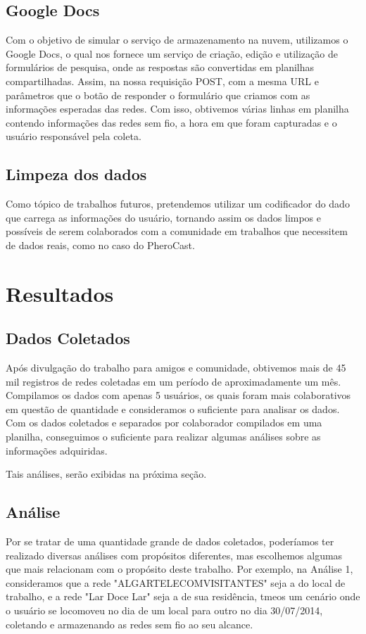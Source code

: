 \documentclass[12pt, %
openright, 
oneside,
a4paper,
brazil]{facom-ufu-abntex2}
\begin{document}
 \section{Google Docs}
Com o objetivo de simular o serviço de armazenamento na nuvem, utilizamos o Google Docs, o qual nos fornece um serviço de criação, edição e utilização de formulários de pesquisa, onde as respostas são convertidas em planilhas compartilhadas. Assim, na nossa requisição POST, com a mesma URL e parâmetros que o botão de responder o formulário que criamos com as informações esperadas das redes. Com isso, obtivemos várias linhas em planilha contendo informações das redes sem fio, a hora em que foram capturadas e o usuário responsável pela coleta.


\section{Limpeza dos dados}
Como tópico de trabalhos futuros, pretendemos utilizar um codificador do dado que carrega as informações do usuário, tornando assim os dados limpos e possíveis de serem colaborados com a comunidade em trabalhos que necessitem de dados reais, como no caso do PheroCast.


\chapter{Resultados}
\section{Dados Coletados}
Após divulgação do trabalho para amigos e comunidade, obtivemos mais de 45 mil registros de redes coletadas em um período de aproximadamente um mês. Compilamos os dados com apenas 5 usuários, os quais foram mais colaborativos em questão de quantidade e consideramos o suficiente para analisar os dados.
Com os dados coletados e separados por colaborador compilados em uma planilha, conseguimos o suficiente para realizar algumas análises sobre as informações adquiridas.

 Tais análises, serão exibidas na próxima seção.

\section{Análise}
Por se tratar de uma quantidade grande de dados coletados, poderíamos ter realizado diversas análises com propósitos diferentes, mas escolhemos algumas que mais relacionam com o propósito deste trabalho. Por exemplo, na Análise 1, consideramos que a rede "ALGARTELECOMVISITANTES"  seja a do local de trabalho, e a rede "Lar Doce Lar" seja a de sua residência, tmeos um cenário onde o usuário se locomoveu no dia  de um local para outro no dia 30/07/2014, coletando e armazenando as redes sem fio ao seu alcance.
\end{document}
